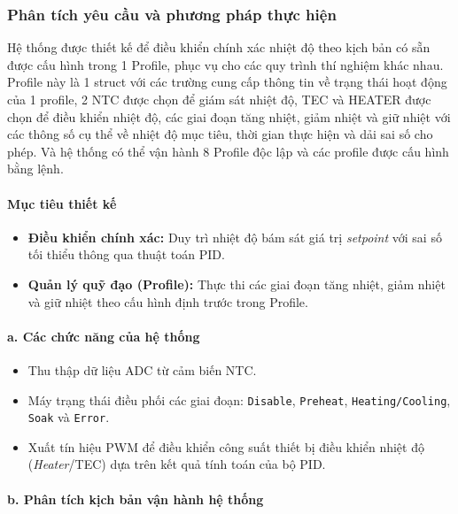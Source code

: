 \subsubsection{Phân tích yêu cầu và phương pháp thực hiện}

Hệ thống được thiết kế để điều khiển chính xác nhiệt độ theo kịch bản có sẵn được cấu hình trong 1 Profile, phục vụ cho các quy trình thí nghiệm khác nhau. Profile này là 1 struct với các trường cung cấp thông tin về trạng thái hoạt động của 1 profile, 2 NTC được chọn để giám sát nhiệt độ, TEC và HEATER được chọn để điều khiển nhiệt độ, các giai đoạn tăng nhiệt, giảm nhiệt và giữ nhiệt với các thông số cụ thể về nhiệt độ mục tiêu, thời gian thực hiện và dải sai số cho phép. Và hệ thống có thể vận hành 8 Profile độc lập và các profile được cấu hình bằng lệnh.

\paragraph{Mục tiêu thiết kế}
\begin{itemize}
    \item \textbf{Điều khiển chính xác:} Duy trì nhiệt độ bám sát giá trị \textit{setpoint} với sai số tối thiểu thông qua thuật toán PID.
    
    \item \textbf{Quản lý quỹ đạo (Profile):} Thực thi các giai đoạn tăng nhiệt, giảm nhiệt và giữ nhiệt theo cấu hình định trước trong Profile.
\end{itemize}

\paragraph{a. Các chức năng của hệ thống}
\begin{itemize}
    \item Thu thập dữ liệu ADC từ cảm biến NTC.
    
    \item Máy trạng thái điều phối các giai đoạn:
    \texttt{Disable}, \texttt{Preheat}, \texttt{Heating/Cooling}, \texttt{Soak} và \texttt{Error}.
    
    \item Xuất tín hiệu PWM để điều khiển công suất thiết bị điều khiển nhiệt độ (\textit{Heater}/TEC) dựa trên kết quả tính toán của bộ PID.
\end{itemize}

\paragraph{b. Phân tích kịch bản vận hành hệ thống}

